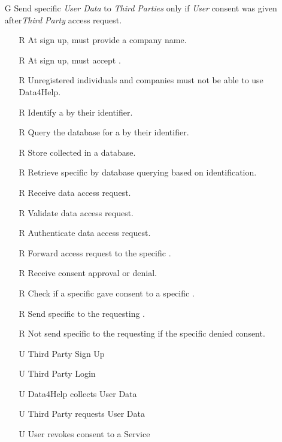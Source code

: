 \documentclass[../../../rasd.tex]{subfiles}
\begin{document}
\begin{itemize}
\begin{itemize}
    \end{itemize}

    \item[G\subs{2}]Send specific \textit{User Data} to \textit{Third Parties} only if \textit{User} consent was given after\textit{Third Party} access request.
    \begin{itemize}
            \item[R\subs{3}]At sign up,  must provide a company name.
            \item[R\subs{5}]At sign up,  must accept .
        \item[R\subs{1}]Unregistered individuals and companies must not be able to use Data4Help.
        \item[R\subs{6}]Identify a  by their identifier.
        \item[R\subs{7}]Query the database for a  by their identifier.
        \item[R\subs{11}]Store collected  in a database.
        \item[R\subs{12}]Retrieve specific  by database querying based on  identification.
        \item[R\subs{13}]Receive  data access request.
        \item[R\subs{14}]Validate  data access request.
        \item[R\subs{15}]Authenticate  data access request.
        \item[R\subs{16}]Forward  access request to the specific .
        \item[R\subs{17}]Receive  consent approval or denial.
        \item[R\subs{18}]Check if a specific  gave consent to a specific .
        \item[R\subs{19}]Send specific to the requesting .
        \item[R\subs{20}]Not send specific to the requesting  if the specific  denied consent.
        \\
        \item[U\subs{2}]Third Party Sign Up
        \item[U\subs{4}]Third Party Login
        \item[U\subs{5}]Data4Help collects User Data
        \item[U\subs{6}]Third Party requests User Data
        \item[U\subs{11}]User revokes consent to a Service
    \end{itemize}


\end{itemize}
\end{document}
